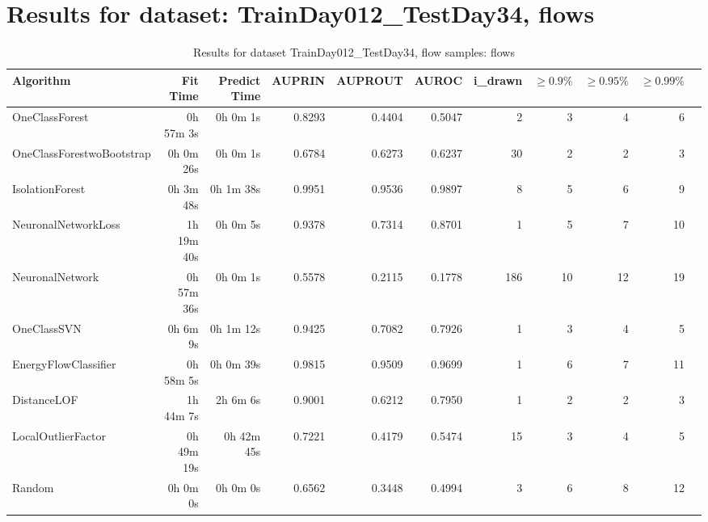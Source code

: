 \documentclass{article}
\begin{document}
\section*{Results for dataset: TrainDay012_TestDay34, flows}
\begin{table}[h!]
\centering
\caption{Results for dataset TrainDay012_TestDay34, flow samples: flows}
\begin{tabular}{lrrrrrrrrrr}
\toprule
Algorithm & Fit Time & Predict Time & AUPRIN & AUPROUT & AUROC & i\_drawn & $\geq 0.9\%$ & $\geq 0.95\%$ & $\geq 0.99\%$ \\
\midrule
OneClassForest & 0h 57m 3s & 0h 0m 1s & 0.8293 & 0.4404 & 0.5047 & 2 & 3 & 4 & 6 \\
OneClassForestwoBootstrap & 0h 0m 26s & 0h 0m 1s & 0.6784 & 0.6273 & 0.6237 & 30 & 2 & 2 & 3 \\
IsolationForest & 0h 3m 48s & 0h 1m 38s & 0.9951 & 0.9536 & 0.9897 & 8 & 5 & 6 & 9 \\
NeuronalNetworkLoss & 1h 19m 40s & 0h 0m 5s & 0.9378 & 0.7314 & 0.8701 & 1 & 5 & 7 & 10 \\
NeuronalNetwork & 0h 57m 36s & 0h 0m 1s & 0.5578 & 0.2115 & 0.1778 & 186 & 10 & 12 & 19 \\
OneClassSVN & 0h 6m 9s & 0h 1m 12s & 0.9425 & 0.7082 & 0.7926 & 1 & 3 & 4 & 5 \\
EnergyFlowClassifier & 0h 58m 5s & 0h 0m 39s & 0.9815 & 0.9509 & 0.9699 & 1 & 6 & 7 & 11 \\
DistanceLOF & 1h 44m 7s & 2h 6m 6s & 0.9001 & 0.6212 & 0.7950 & 1 & 2 & 2 & 3 \\
LocalOutlierFactor & 0h 49m 19s & 0h 42m 45s & 0.7221 & 0.4179 & 0.5474 & 15 & 3 & 4 & 5 \\
Random & 0h 0m 0s & 0h 0m 0s & 0.6562 & 0.3448 & 0.4994 & 3 & 6 & 8 & 12 \\
\bottomrule
\end{tabular}
\end{table}
\end{document}

